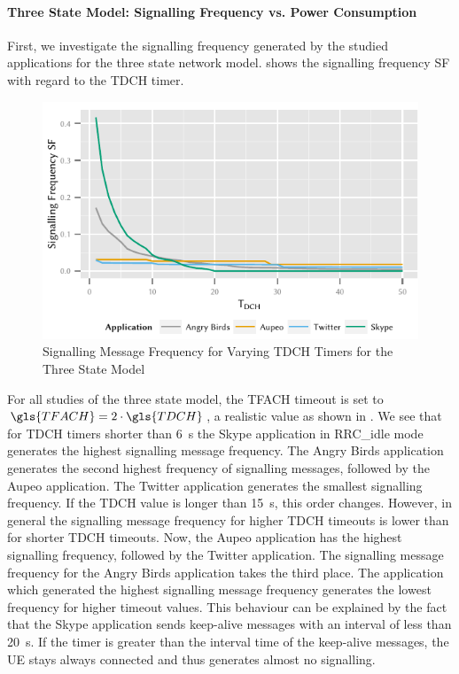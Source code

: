 \paragraph*{Three State Model: Signalling Frequency vs. Power Consumption}\label{sec:network:network_traces:numerical_results:three_states}
First, we investigate the signalling frequency generated by the studied applications for the three state network model. 
 shows the signalling frequency \gls{SF} with regard to the \gls{TDCH} timer.
\begin{figure}
	\centering
	\includegraphics{network/network_traces/numerical_results/figures/3_state_tdch_vs_frequency}
	\caption{Signalling Message Frequency for Varying \gls{TDCH} Timers for the Three State Model}\label{fig:network:network_traces:numerical_results:three_states:three_states:signalling}
\end{figure}
For all studies of the three state model, the \gls{TFACH} timeout is set to \(\gls{TFACH} = 2\cdot  \gls{TDCH}\), a realistic value as shown in \cite{Qian2011}.
We see that for \gls{TDCH} timers shorter than \SI{6}{\second} the Skype application in \gls{RRC_idle} mode generates the highest signalling message frequency.
The Angry Birds application generates the second highest frequency of signalling messages, followed by the Aupeo application.
The Twitter application generates the smallest signalling frequency.
If the \gls{TDCH} value is longer than \SI{15}{\second}, this order changes.
However, in general the signalling message frequency for higher \gls{TDCH} timeouts is lower than for shorter \gls{TDCH} timeouts.
Now, the Aupeo application has the highest signalling frequency, followed by the Twitter application.
The signalling message frequency for the Angry Birds application takes the third place.
The application which generated the highest signalling message frequency generates the lowest frequency for higher timeout values.
This behaviour can be explained by the fact that the Skype application sends keep-alive messages with an interval of less than \SI{20}{\second}.
If the timer is greater than the interval time of the keep-alive messages, the \gls{UE} stays always connected and thus generates almost no signalling.

